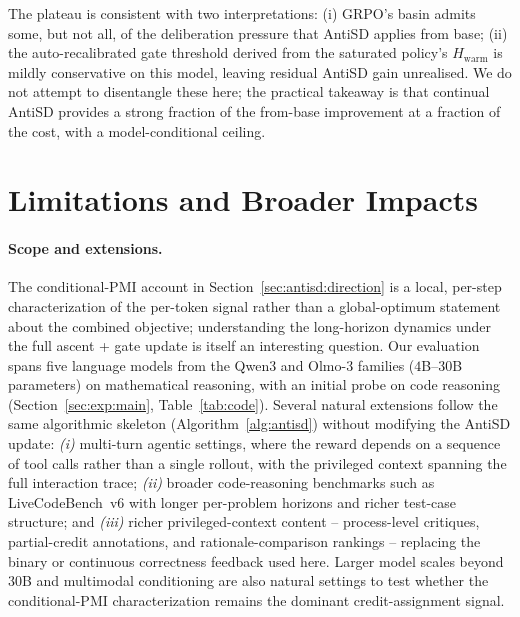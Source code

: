 \documentclass{llmxive}
\begin{document}
The plateau is consistent with two interpretations: (i) GRPO's basin admits some, but not all, of the deliberation pressure that AntiSD applies from base; (ii) the auto-recalibrated gate threshold derived from the saturated policy's $H_{\mathrm{warm}}$ is mildly conservative on this model, leaving residual AntiSD gain unrealised. We do not attempt to disentangle these here; the practical takeaway is that continual AntiSD provides a strong fraction of the from-base improvement at a fraction of the cost, with a model-conditional ceiling.

\section{Limitations and Broader Impacts}
\label{app:impacts}

\paragraph{Scope and extensions.} The conditional-PMI account in Section~\ref{sec:antisd:direction} is a local, per-step characterization of the per-token signal rather than a global-optimum statement about the combined objective; understanding the long-horizon dynamics under the full ascent + gate update is itself an interesting question. Our evaluation spans five language models from the Qwen3 and Olmo-3 families ($4$B--$30$B parameters) on mathematical reasoning, with an initial probe on code reasoning (Section~\ref{sec:exp:main}, Table~\ref{tab:code}). Several natural extensions follow the same algorithmic skeleton (Algorithm~\ref{alg:antisd}) without modifying the AntiSD update: \emph{(i)} multi-turn agentic settings, where the reward depends on a sequence of tool calls rather than a single rollout, with the privileged context spanning the full interaction trace; \emph{(ii)} broader code-reasoning benchmarks such as LiveCodeBench~v6 with longer per-problem horizons and richer test-case structure; and \emph{(iii)} richer privileged-context content -- process-level critiques, partial-credit annotations, and rationale-comparison rankings -- replacing the binary or continuous correctness feedback used here. Larger model scales beyond $30$B and multimodal conditioning are also natural settings to test whether the conditional-PMI characterization remains the dominant credit-assignment signal.
\end{document}

